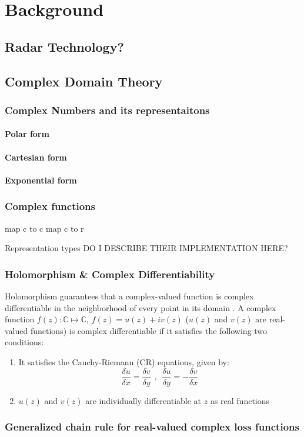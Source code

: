 \chapter{Background}\label{chap:comp}
\section{Radar Technology?}


\section{Complex Domain Theory}

\subsection{Complex Numbers and its representaitons}
\subsubsection{Polar form}
\subsubsection{Cartesian form}
\subsubsection{Exponential form}
\subsection{Complex functions}
map c to c
map c to r



Representation types
DO I DESCRIBE THEIR IMPLEMENTATION HERE?

\subsection{Holomorphism \& Complex Differentiability}

Holomorphism guarantees that a complex-valued function is complex differentiable in the neighborhood of every point in its domain \cite{trabelsi2018deep}.
A complex function $f(z): \mathbb{C} \mapsto \mathbb{C}$, $f(z)= u(z) + iv(z)$ ($u(z)$ and $v(z)$ are real-valued functions) is complex differentiable if it satisfies the following two conditions:
\begin{enumerate}

	\item It satisfies the Cauchy-Riemann (CR) equations, given by:
\begin{equation}\label{eq:compdiff}
\frac{\delta u}{\delta x} = \frac{\delta v}{\delta y} ~~,~~ \frac{\delta u}{\delta y} = - \frac{\delta v}{\delta x} 
\end{equation}
	\item $u(z)$ and $v(z)$ are individually differentiable at $z$ as real functions	
\end{enumerate} 


 
\subsection{Generalized chain rule for real-valued complex loss  functions}\label{cchainrule}



